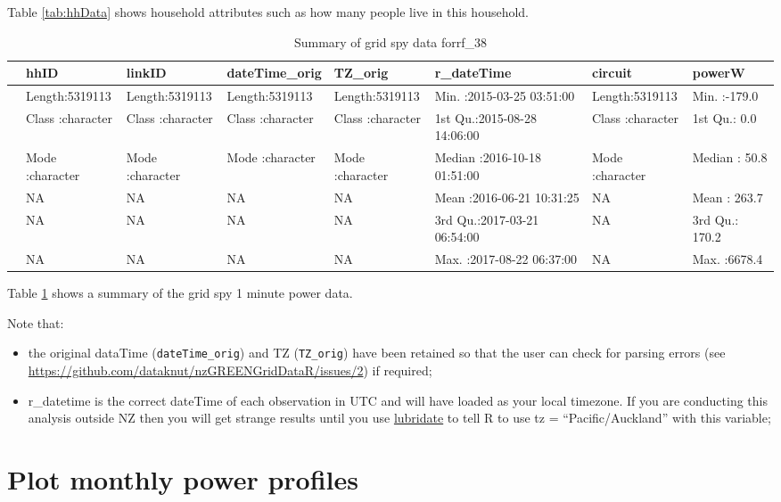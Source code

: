 \documentclass[]{article}
\providecommand{\tightlist}{%
  \setlength{\itemsep}{0pt}\setlength{\parskip}{0pt}}
\theoremstyle{definition}
\theoremstyle{definition}
\theoremstyle{definition}
\theoremstyle{remark}
\begin{document}
Table \ref{tab:hhData} shows household attributes such as how many
people live in this household.

\begin{table}

\caption{\label{tab:gsData}Summary of grid spy data forrf_38}
\centering
\begin{tabular}[t]{l|l|l|l|l|l|l|l}
\hline
  &     hhID &    linkID & dateTime\_orig &   TZ\_orig &   r\_dateTime &   circuit &     powerW\\
\hline
 & Length:5319113 & Length:5319113 & Length:5319113 & Length:5319113 & Min.   :2015-03-25 03:51:00 & Length:5319113 & Min.   :-179.0\\
\hline
 & Class :character & Class :character & Class :character & Class :character & 1st Qu.:2015-08-28 14:06:00 & Class :character & 1st Qu.:   0.0\\
\hline
 & Mode  :character & Mode  :character & Mode  :character & Mode  :character & Median :2016-10-18 01:51:00 & Mode  :character & Median :  50.8\\
\hline
 & NA & NA & NA & NA & Mean   :2016-06-21 10:31:25 & NA & Mean   : 263.7\\
\hline
 & NA & NA & NA & NA & 3rd Qu.:2017-03-21 06:54:00 & NA & 3rd Qu.: 170.2\\
\hline
 & NA & NA & NA & NA & Max.   :2017-08-22 06:37:00 & NA & Max.   :6678.4\\
\hline
\end{tabular}
\end{table}

Table \ref{tab:gsData} shows a summary of the grid spy 1 minute power
data.

Note that:

\begin{itemize}
\tightlist
\item
  the original dataTime (\texttt{dateTime\_orig}) and TZ
  (\texttt{TZ\_orig}) have been retained so that the user can check for
  parsing errors (see
  \url{https://github.com/dataknut/nzGREENGridDataR/issues/2}) if
  required;
\item
  r\_datetime is the correct dateTime of each observation in UTC and
  will have loaded as your local timezone. If you are conducting this
  analysis outside NZ then you will get strange results until you use
  \href{https://lubridate.tidyverse.org/}{lubridate} to tell R to use tz
  = ``Pacific/Auckland'' with this variable;
\end{itemize}

\section{Plot monthly power profiles}\label{plot-monthly-power-profiles}
\end{document}
